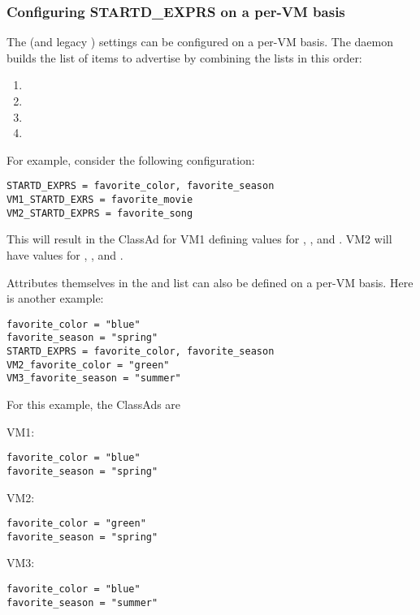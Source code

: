 \subsubsection{\label{sec:SMP-exprs}
Configuring STARTD\_EXPRS on a per-VM basis}

The  (and legacy ) settings
can be configured on a per-VM basis.
The  daemon builds the list of items to
advertise by combining the lists in this order:
\begin{enumerate}
\item{}
\item{}
\item{} 
\item{}
\end{enumerate}

For example, consider the following configuration:
\begin{verbatim}
STARTD_EXPRS = favorite_color, favorite_season
VM1_STARTD_EXRS = favorite_movie
VM2_STARTD_EXPRS = favorite_song
\end{verbatim}

This will result in the  ClassAd for
VM1 defining values for 
, ,
and .
VM2 will have values for 
, , and .

Attributes themselves in the 
and  list 
can also be defined on a per-VM basis.  
Here is another example:

\begin{verbatim}
favorite_color = "blue"
favorite_season = "spring"
STARTD_EXPRS = favorite_color, favorite_season
VM2_favorite_color = "green"
VM3_favorite_season = "summer"
\end{verbatim}

For this example, the  ClassAds are
\begin{description}
\item{VM1}:
\begin{verbatim}
favorite_color = "blue"
favorite_season = "spring"
\end{verbatim}
\item{VM2}:
\begin{verbatim}
favorite_color = "green"
favorite_season = "spring"
\end{verbatim}
\item{VM3}:
\begin{verbatim}
favorite_color = "blue"
favorite_season = "summer"
\end{verbatim}
\end{description}

